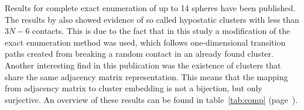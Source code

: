 Results for complete exact enumeration of up to 14
spheres\autocite{Arkus_DerivingFiniteSphere_2011,Hoy_Structurefinitesphere_2012,Hoy_Structuredynamicsmodel_2015,Holmes-Cerfon_EnumeratingRigidSphere_2016}
have been published. The results by
\citeauthor{Holmes-Cerfon_EnumeratingRigidSphere_2016}\autocite{Holmes-Cerfon_EnumeratingRigidSphere_2016}
also showed evidence of so called hypostatic clusters with less than $3N-6$
contacts. This is due to the fact that in this study a modification of the exact
enumeration method was used, which follows one-dimensional transition paths
created from breaking a random contact in an already found cluster. Another
interesting find in this publication was the existence of clusters that share
the same adjacency matrix representation. This means that the mapping from
adjacency matrix to cluster embedding is not a bijection, but only surjective.
An overview of these results can be found in table~\ref{tab:comp}
(page~\pageref{tab:comp}).